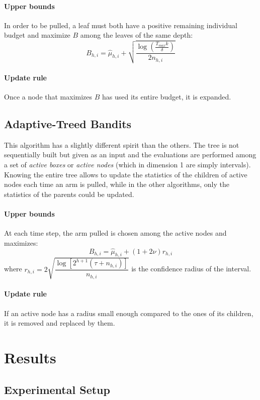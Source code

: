 \documentclass[a4paper,10pt]{article}
\begin{document}
\paragraph{Upper bounds} In order to be pulled, a leaf must both have a positive remaining individual budget and maximize $B$ among the leaves of the same depth:
\begin{equation}
\label{bsoo}
B_{h,i}=\widehat{\mu}_{h,i}+\sqrt{\dfrac{\log(\frac{T_{max}k}{\delta})}{2n_{h,i}}}
\end{equation}
\paragraph{Update rule} Once a node that maximizes $B$ has used its entire budget, it is expanded.


\subsection{Adaptive-Treed Bandits}
This algorithm has a slightly different spirit than the others. The tree is not sequentially built but given as an input and the evaluations are performed among a set of \textit{active boxes} or \textit{active nodes} (which in dimension 1 are simply intervals). Knowing the entire tree allows to update the statistics of the children of active nodes each time an arm is pulled, while in the other algorithms, only the statistics of the parents could be updated.
\paragraph{Upper bounds} At each time step, the arm pulled is chosen among the active nodes and maximizes:
\begin{equation}
B_{h,i} = \widehat{\mu}_{h,i}+(1+2\nu)r_{h,i}
\end{equation}
where $r_{h,i}=2\sqrt{\dfrac{\log[2^{h+1}(\tau+n_{h,i})]}{n_{h,i}}}$ is the confidence radius of the interval.
\paragraph{Update rule} If an active node has a radius small enough compared to the ones of its children, it is removed and replaced by them.

\section{Results}
\subsection{Experimental Setup}
\end{document}
